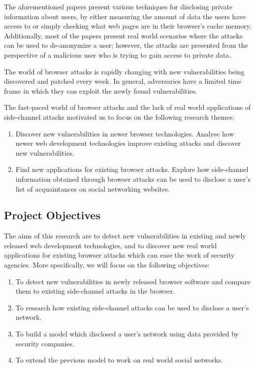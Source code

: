 \documentclass[a4paper,11pt]{article}
\begin{document}
The aforementioned papers present various techniques for disclosing private information about users, by either measuring the amount of data the users have access to or simply checking what web pages are in their browser's cache memory. Additionally, most of the papers present real world scenarios where the attacks can be used to de-anonymize a user; however, the attacks are presented from the perspective of a malicious user who is trying to gain access to private data.

The world of browser attacks is rapidly changing with new vulnerabilities being discovered and patched every week. In general, adversaries have a limited time frame in which they can exploit the newly found vulnerabilities. 

The fast-paced world of browser attacks and the lack of real world applications of side-channel attacks motivated us to focus on the following research themes:
\begin{enumerate}
\item Discover new vulnerabilities in newer browser technologies. Analyse how newer web development technologies improve existing attacks and discover new vulnerabilities.
\item Find new applications for existing browser attacks. Explore how side-channel information obtained through browser attacks can be used to disclose a user's list of acquaintances on social networking websites.
\end{enumerate}

\subsection*{Project Objectives}

The aims of this research are to detect new vulnerabilities in existing and newly released web development technologies, and to discover new real world applications for existing browser attacks which can ease the work of security agencies. More specifically, we will focus on the following objectives:
\begin{enumerate}
\item To detect new vulnerabilities in newly released browser software and compare them to existing side-channel attacks in the browser.
\item To research how existing side-channel attacks can be used to disclose a user's network.
\item To build a model which disclosed a user's network using data provided by security companies.
\item To extend the previous model to work on real world social networks.
\end{enumerate}
\end{document}
